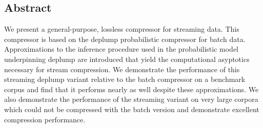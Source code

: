 \subsection*{Abstract}

We present a general-purpose, lossless compressor for  streaming data.  This compressor is based on the deplump probabilistic compressor for batch data.  Approximations to the inference procedure used in the probabilistic model underpinning deplump are introduced that yield the computational asyptotics necessary for stream compression. We demonstrate the performance of this streaming deplump variant relative to the batch compressor on a benchmark corpus and find that it performs nearly as well despite these approximations.  We also demonstrate the performance of the streaming variant on very large corpora which could not be compressed with the batch version and demonstrate excellent compression performance.


